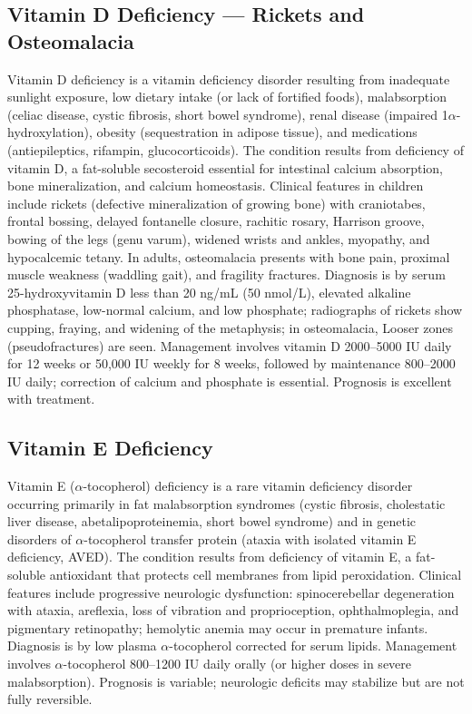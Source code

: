 \subsection{Vitamin D Deficiency --- Rickets and Osteomalacia}
\label{sec:Vitamin D Deficiency}
Vitamin D deficiency is a vitamin deficiency disorder resulting from inadequate sunlight exposure, low dietary intake (or lack of fortified foods), malabsorption (celiac disease, cystic fibrosis, short bowel syndrome), renal disease (impaired 1$\alpha$-hydroxylation), obesity (sequestration in adipose tissue), and medications (antiepileptics, rifampin, glucocorticoids). The condition results from deficiency of vitamin D, a fat-soluble secosteroid essential for intestinal calcium absorption, bone mineralization, and calcium homeostasis. Clinical features in children include rickets (defective mineralization of growing bone) with craniotabes, frontal bossing, delayed fontanelle closure, rachitic rosary, Harrison groove, bowing of the legs (genu varum), widened wrists and ankles, myopathy, and hypocalcemic tetany. In adults, osteomalacia presents with bone pain, proximal muscle weakness (waddling gait), and fragility fractures. Diagnosis is by serum 25-hydroxyvitamin D less than 20 ng/mL (50 nmol/L), elevated alkaline phosphatase, low-normal calcium, and low phosphate; radiographs of rickets show cupping, fraying, and widening of the metaphysis; in osteomalacia, Looser zones (pseudofractures) are seen. Management involves vitamin D 2000--5000 IU daily for 12 weeks or 50,000 IU weekly for 8 weeks, followed by maintenance 800--2000 IU daily; correction of calcium and phosphate is essential. Prognosis is excellent with treatment.

\subsection{Vitamin E Deficiency}
\label{sec:Vitamin E Deficiency}
Vitamin E ($\alpha$-tocopherol) deficiency is a rare vitamin deficiency disorder occurring primarily in fat malabsorption syndromes (cystic fibrosis, cholestatic liver disease, abetalipoproteinemia, short bowel syndrome) and in genetic disorders of $\alpha$-tocopherol transfer protein (ataxia with isolated vitamin E deficiency, AVED). The condition results from deficiency of vitamin E, a fat-soluble antioxidant that protects cell membranes from lipid peroxidation. Clinical features include progressive neurologic dysfunction: spinocerebellar degeneration with ataxia, areflexia, loss of vibration and proprioception, ophthalmoplegia, and pigmentary retinopathy; hemolytic anemia may occur in premature infants. Diagnosis is by low plasma $\alpha$-tocopherol corrected for serum lipids. Management involves $\alpha$-tocopherol 800--1200 IU daily orally (or higher doses in severe malabsorption). Prognosis is variable; neurologic deficits may stabilize but are not fully reversible.

